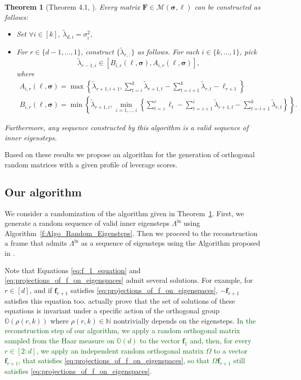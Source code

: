 \documentclass[twoside,11pt]{book}
\newcommand{\rev}[1]{\textcolor{darkgreen}{#1}}
\newtheorem{theorem}{Theorem}
\numberwithin{theorem}{chapter}
\numberwithin{definition}{chapter}
\numberwithin{proposition}{chapter}
\numberwithin{corollary}{chapter}
\numberwithin{example}{chapter}
\numberwithin{lemma}{chapter}
\numberwithin{assumption}{chapter}
\begin{document}
\begin{theorem}[Theorem 4.1, \citealp{FMPS13}]\label{thm:parametrization_of_polytope}
Every matrix $\bm{F}\in\mathcal{M}({\bm{\sigma},\bm{\ell}})$ can be constructed as follows:
\begin{itemize}
    \item Set $\forall i \in [k], \: \tilde\lambda_{d,i} = \sigma_{i}^2$,
    \item For $r \in \{d-1, \dots, 1 \}$, construct $\{\tilde\lambda_{r,:}\}$ as follows. For each $i \in \{k, \dots , 1\}$, pick $$\tilde\lambda_{r-1,i} \in [B_{i,r}(\bm{\ell},\bm{\sigma}),A_{i,r}(\bm{\ell},\bm{\sigma})],$$ where
    \begin{equation}
    \begin{split}
      A_{i,r}(\bm{\ell},\bm{\sigma}) = \max \left\{\tilde\lambda_{r+1,i+1}, \sum\limits_{t = i}^{k}\tilde\lambda_{r+1,t} - \sum\limits_{t = i+1}^{k}\tilde\lambda_{r,t} - \ell_{r+1} \right\}\\
      B_{i,r}(\bm{\ell},\bm{\sigma}) = \min \left\{\tilde\lambda_{r+1,i}, \min\limits_{z = 1,\dots,i} \left\{\sum\limits_{t=z}^{r}\ell_{t} - \sum\limits_{t=z+1}^{i}\tilde\lambda_{r+1,t} - \sum\limits_{t=i+1}^{k}\tilde\lambda_{r,t}\right\} \right\}.
    \end{split}
    \end{equation}
  \end{itemize}
Furthermore, any sequence constructed by this algorithm is a valid sequence of inner eigensteps.
\end{theorem}

Based on these results we propose an algorithm for the generation of orthogonal random matrices with a given profile of leverage scores.

\subsection{Our algorithm}
We consider a randomization of the algorithm given in Theorem~\ref{thm:parametrization_of_polytope}.
First, we generate a random sequence of valid inner eigensteps $\Lambda^{\text{in}}$ using Algorithm~\ref{f:Algo_Random_Eigensteps}. Then we proceed to the reconstruction a frame that admits $\Lambda^{\text{in}}$ as a sequence of eigensteps using the Algorithm proposed in \citep{FiMiPo11}.

Note that Equations \eqref{eq:f_1_equation} and \eqref{eq:projections_of_f_on_eigenspaces} admit several solutions. For example, for $r \in [d]$, and if $\bm{f}_{r+1}$ satisfies \eqref{eq:projections_of_f_on_eigenspaces}, $-\bm{f}_{r+1}$ satisfies this equation too. \cite{FiMiPo11} actually prove that the set of solutions of these equations is invariant under a specific action of the orthogonal group $\mathbb{O}(\rho(r,k))$ where $\rho(r,k) \in \mathbb{N}$ nontrivially depends on the eigensteps. \rev{In the reconstruction step of our algorithm, we apply a random orthogonal matrix sampled from the Haar measure on $\mathbb{O}(d)$ to the vector $\bm{f}_{1}$ and, then, for every $r \in [2:d]$, we apply an independent random orthogonal matrix $\Omega$ to a vector $\bm{f}_{r+1}$, that satisfies \eqref{eq:projections_of_f_on_eigenspaces}, so that $\Omega \bm{f}_{r+1}$ still satisfies \eqref{eq:projections_of_f_on_eigenspaces}.}
\end{document}
